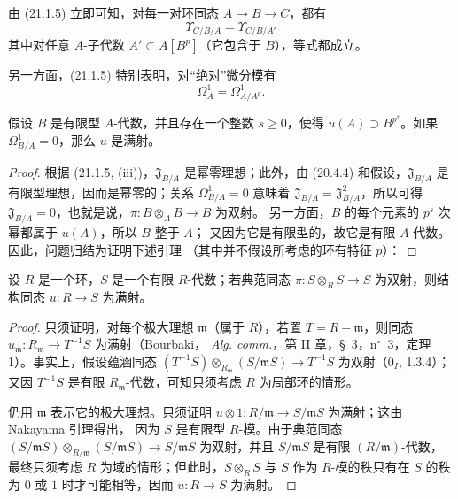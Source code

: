 由 (21.1.5) 立即可知，对每一对环同态 $A\to B\to C$，都有
\begin{equation}
\tag{21.1.5.1}
\label{0.21.1.5.1-fr}
\Upsilon_{C/B/A}=\Upsilon_{C/B/A'}
\end{equation}
其中对任意 $A$-子代数 $A'\subset A[B^p]$（它包含于 $B$），等式都成立。

另一方面，(21.1.5) 特别表明，对“绝对”微分模有
\begin{equation}
\tag{21.1.5.2}
\label{0.21.1.5.2-fr}
\Omega^1_A=\Omega^1_{A/A^p}.
\end{equation}

\begin{corollary}[21.1.6]
\label{0.21.1.6-fr}
假设 $B$ 是有限型 $A$-代数，并且存在一个整数 $s\geq0$，使得
$u(A)\supset B^{p^s}$。如果 $\Omega^1_{B/A}=0$，那么 $u$ 是满射。
\end{corollary}

\begin{proof}
根据 (21.1.5, (iii))，$\mathfrak J_{B/A}$ 是幂零理想；此外，由 (20.4.4)
和假设，$\mathfrak J_{B/A}$ 是有限型理想，因而是幂零的；关系
$\Omega^1_{B/A}=0$ 意味着
$\mathfrak J_{B/A}=\mathfrak J_{B/A}^2$，所以可得
$\mathfrak J_{B/A}=0$，也就是说，$\pi:B\otimes_A B\to B$ 为双射。
另一方面，$B$ 的每个元素的 $p^s$ 次幂都属于 $u(A)$，所以 $B$ 整于 $A$；
又因为它是有限型的，故它是有限 $A$-代数。因此，问题归结为证明下述引理
（其中并不假设所考虑的环有特征 $p$）：
\end{proof}

\begin{lemma}[21.1.6.1]
\label{0.21.1.6.1-fr}
设 $R$ 是一个环，$S$ 是一个有限 $R$-代数；若典范同态
$\pi:S\otimes_R S\to S$ 为双射，则结构同态 $u:R\to S$ 为满射。
\end{lemma}

\begin{proof}
只须证明，对每个极大理想 $\mathfrak m$（属于 $R$），若置
$T=R-\mathfrak m$，则同态
$u_{\mathfrak m}:R_{\mathfrak m}\to T^{-1}S$ 为满射（Bourbaki，
\emph{Alg. comm.}，第 II 章，§~3，n$^\circ$~3，定理 1）。事实上，假设蕴涵同态
$(T^{-1}S)\otimes_{R_{\mathfrak m}}(S/\mathfrak mS)\to T^{-1}S$
为双射（0$_I$, 1.3.4）；又因 $T^{-1}S$ 是有限
$R_{\mathfrak m}$-代数，可知只须考虑 $R$ 为局部环的情形。

仍用 $\mathfrak m$ 表示它的极大理想。只须证明
$u\otimes1:R/\mathfrak m\to S/\mathfrak mS$ 为满射；这由 Nakayama 引理得出，
因为 $S$ 是有限型 $R$-模。由于典范同态
$(S/\mathfrak mS)\otimes_{R/\mathfrak m}(S/\mathfrak mS)\to S/\mathfrak mS$
为双射，并且 $S/\mathfrak mS$ 是有限 $(R/\mathfrak m)$-代数，最终只须考虑
$R$ 为域的情形；但此时，$S\otimes_R S$ 与 $S$ 作为 $R$-模的秩只有在
$S$ 的秩为 $0$ 或 $1$ 时才可能相等，因而 $u:R\to S$ 为满射。
\end{proof}

